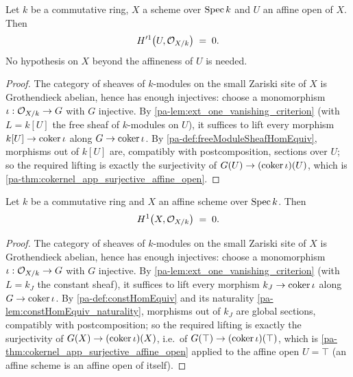 \begin{theorem}
  \label{pa-thm:affine_open_h1_vanishing}
  \leanok

  Let \(k\) be a commutative ring, \(X\) a scheme over \(\operatorname{Spec} k\) and \(U\) an affine open
  of \(X\). Then
  \[
    H'^1\bigl(U, \mathcal{O}_{X/k}\bigr) \;=\; 0 .
  \]
  No hypothesis on \(X\) beyond the affineness of \(U\) is needed.
\end{theorem}
\begin{proof}
  \leanok
  The category of sheaves of \(k\)-modules on the small Zariski site of \(X\) is Grothendieck
  abelian, hence has enough injectives: choose a monomorphism
  \(\iota : \mathcal{O}_{X/k} \to G\) with \(G\) injective. By
  \ref{pa-lem:ext_one_vanishing_criterion} (with \(L = k[U]\) the free sheaf of \(k\)-modules on
  \(U\)), it suffices to lift every morphism \(k[U] \to \operatorname{coker} \iota\) along
  \(G \to \operatorname{coker} \iota\). By \ref{pa-def:freeModuleSheafHomEquiv}, morphisms out of \(k[U]\) are,
  compatibly with postcomposition, sections over \(U\); so the required lifting is exactly
  the surjectivity of \(G(U) \to (\operatorname{coker} \iota)(U)\), which is
  \ref{pa-thm:cokernel_app_surjective_affine_open}.
\end{proof}

\begin{theorem}
  \label{pa-thm:affine_vanishing}
  \leanok

  Let \(k\) be a commutative ring and \(X\) an affine scheme over \(\operatorname{Spec} k\). Then
  \[
    H^1\bigl(X, \mathcal{O}_{X/k}\bigr) \;=\; 0 .
  \]
\end{theorem}
\begin{proof}
  \leanok
  The category of sheaves of \(k\)-modules on the small Zariski site of \(X\) is Grothendieck
  abelian, hence has enough injectives: choose a monomorphism
  \(\iota : \mathcal{O}_{X/k} \to G\) with \(G\) injective. By
  \ref{pa-lem:ext_one_vanishing_criterion} (with \(L = k_J\) the constant sheaf), it suffices to
  lift every morphism \(k_J \to \operatorname{coker} \iota\) along \(G \to \operatorname{coker} \iota\). By
  \ref{pa-def:constHomEquiv} and its naturality \ref{pa-lem:constHomEquiv_naturality}, morphisms
  out of \(k_J\) are global sections, compatibly with postcomposition; so the required
  lifting is exactly the surjectivity of \(G(X) \to (\operatorname{coker} \iota)(X)\), i.e.\ of
  \(G(\top) \to (\operatorname{coker} \iota)(\top)\), which is
  \ref{pa-thm:cokernel_app_surjective_affine_open} applied to the affine open \(U = \top\)
  (an affine scheme is an affine open of itself).
\end{proof}

